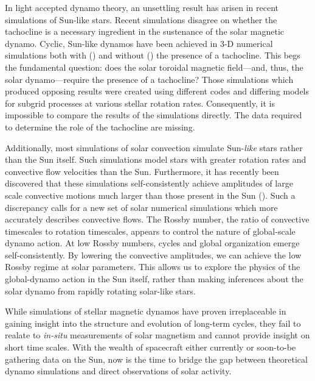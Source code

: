 \documentclass[aasms,12pt]{article}
\begin{document}
In light accepted dynamo theory, an unsettling result has arisen
in recent simulations of Sun-like stars.  Recent simulations disagree
on whether the tachocline is a necessary ingredient
in the sustenance of the solar magnetic dynamo.  Cyclic, Sun-like dynamos
have been
achieved in 3-D numerical simulations both with
(\citealt{Ghizaru2010, Racine2011})
and without (\citealt{Brown2011, Nelson2013}) the presence of a tachocline. This
begs the fundamental question: does the solar toroidal magnetic field---and, thus,
the solar dynamo---require the presence of a tachocline?
Those simulations which produced opposing
results were created using different codes and differing models for subgrid
processes at various stellar rotation rates.  Consequently, it is impossible to
compare the results of the simulations directly.  The data required
to determine the role of the tachocline are missing.

Additionally, most simulations
of solar convection simulate Sun-\emph{like} stars rather than the Sun
itself.  Such simulations model stars with greater rotation rates and 
convective flow velocities than the Sun.  Furthermore, it has recently 
been discovered
that these simulations self-consistently achieve amplitudes of 
large scale convective motions much larger than those present in 
the Sun
(\citealt{lord2014}).  Such a discrepancy calls for a new set of solar 
numerical simulations which more accurately describes convective flows.
The Rossby number, the ratio of convective timescales to rotation timescales,
appears to control the nature of global-scale dynamo action.  At low Rossby
numbers, cycles and global organization emerge self-consistently.  By lowering
the convective amplitudes, we can achieve the low Rossby regime at solar
parameters.  This allows us to explore the physics of the global-dynamo action
in the Sun itself, rather than making inferences about the solar dynamo from
rapidly rotating solar-like stars.

While simulations of stellar magnetic dynamos have proven
irreplaceable in gaining insight into the structure and evolution of 
long-term cycles, they fail to realate to \emph{in-situ} measurements
of solar magnetism and cannot provide insight on short time scales.
With the wealth of spacecraft either currently or soon-to-be 
gathering data on the Sun, now is the time to bridge the gap between 
theoretical dynamo simulations and direct observations of solar activity.
\end{document}
